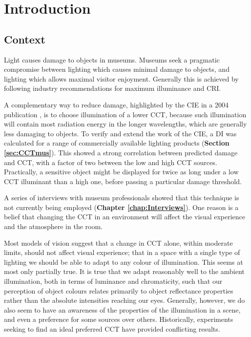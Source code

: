 \chapter{Introduction}
\label{chapterlabel1}

\section{Context}
Light causes damage to objects in museums. Museums seek a pragmatic compromise between lighting which causes minimal damage to objects, and lighting which allows maximal visitor enjoyment. Generally this is achieved by following industry recommendations for maximum illuminance and \gls{CRI}.

A complementary way to reduce damage, highlighted by the \gls{CIE} in a 2004 publication \citep{cie_cie_2004}, is to choose illumination of a lower \gls{CCT}, because such illumination will contain most radiation energy in the longer wavelengths, which are generally less damaging to objects. To verify and extend the work of the \gls{CIE}, a \gls{DI} was calculated for a range of commercially available lighting products (\textbf{Section \ref{sec:CCTmus}}). This showed a strong correlation between predicted damage and \gls{CCT}, with a factor of two between the low and high \gls{CCT} sources. Practically, a sensitive object might be displayed for twice as long under a low \gls{CCT} illuminant than a high one, before passing a particular damage threshold. 

A series of interviews with museum professionals showed that this technique is not currently being employed (\textbf{Chapter \ref{chap:Interviews}}). One reason is a belief that changing the \gls{CCT} in an environment will affect the visual experience and the atmosphere in the room.

Most models of vision suggest that a change in \gls{CCT} alone, within moderate limits, should not affect visual experience; that in a space with a single type of lighting we should be able to adapt to any colour of illumination. This seems at most only partially true. It is true that we adapt reasonably well to the ambient illumination, both in terms of luminance and chromaticity, such that our perception of object colours relates primarily to object reflectance properties rather than the absolute intensities reaching our eyes. Generally, however, we do also seem to have an awareness of the properties of the illumination in a scene, and even a preference for some sources over others. Historically, experiments seeking to find an ideal preferred \gls{CCT} have provided conflicting results.

